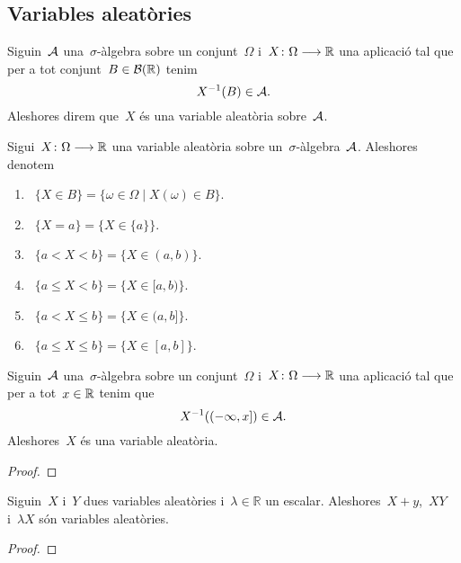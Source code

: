 \documentclass[../../main.tex]{subfiles}
\begin{document}
\subsection{Variables aleatòries}
    \begin{definition}
        \label{def:variable aleatòria}
        Siguin~\(\mathcal{A}\) una~\(\sigma\)-àlgebra sobre un conjunt~\(\Omega\) i~\(X\colon\Omega\longrightarrow\mathbb{R}\) una aplicació tal que per a tot conjunt~\(B\in\mathcal{B}(\mathbb{R})\) tenim
        \[
            X^{-1}(B)\in\mathcal{A}.
        \]
        Aleshores direm que~\(X\) és una variable aleatòria sobre~\(\mathcal{A}\).
    \end{definition}
    \begin{example}
    \end{example}
    \begin{notation}
        \label{not:variables aleatòries}
        Sigui~\(X\colon\Omega\longrightarrow\mathbb{R}\) una variable aleatòria sobre un~\(\sigma\)-àlgebra~\(\mathcal{A}\).
        Aleshores denotem
        \begin{enumerate}
            \item~\(\{X\in B\}=\{\omega\in\Omega\mid X(\omega)\in B\}\).
            \item~\(\{X=a\}=\{X\in\{a\}\}\).
            \item~\(\{a< X<b\}=\{X\in(a,b)\}\).
            \item~\(\{a\leq X<b\}=\{X\in[a,b)\}\).
            \item~\(\{a< X\leq b\}=\{X\in(a,b]\}\).
            \item~\(\{a\leq X\leq b\}=\{X\in[a,b]\}\).
        \end{enumerate}
    \end{notation}
    \begin{proposition}
        \label{prop:condició suficient per ser una variable aleatòria}
        Siguin~\(\mathcal{A}\) una~\(\sigma\)-àlgebra sobre un conjunt~\(\Omega\) i~\(X\colon\Omega\longrightarrow\mathbb{R}\) una aplicació tal que per a tot~\(x\in\mathbb{R}\) tenim que
        \[
            X^{-1}((-\infty,x])\in\mathcal{A}.
        \]
        Aleshores~\(X\) és una variable aleatòria.
        \begin{proof}
        \end{proof}
    \end{proposition}
    \begin{proposition}
        \label{prop:les variables aleatòries formen un anell}
        Siguin~\(X\) i~\(Y\) dues variables aleatòries i~\(\lambda\in\mathbb{R}\) un escalar.
        Aleshores~\(X+y\),~\(XY\) i~\(\lambda X\) són variables aleatòries.
        \begin{proof}
        \end{proof}
    \end{proposition}
\end{document}
